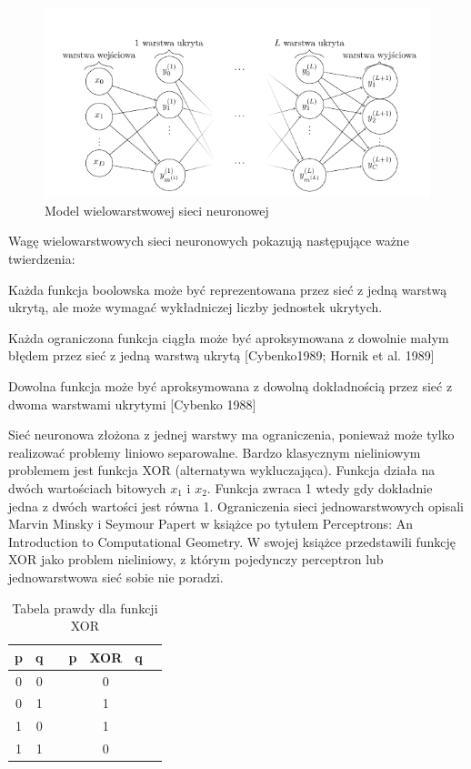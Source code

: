 \begin{figure}[H]
	\centering
	\includegraphics[width=0.7\linewidth]{multi_layer_neural}
	\caption{Model wielowarstwowej sieci neuronowej}
	\label{fig:multilayerneural}
\end{figure}



Wagę wielowarstwowych sieci neuronowych pokazują następujące ważne twierdzenia:

\begin{twierdzenie}
	Każda funkcja boolowska może być reprezentowana przez sieć z jedną warstwą ukrytą, ale może wymagać wykładniczej liczby jednostek ukrytych.
\end{twierdzenie}

\begin{twierdzenie}
	Każda ograniczona funkcja ciągła może być aproksymowana z dowolnie małym błędem przez sieć z jedną warstwą ukrytą [Cybenko1989; Hornik et al. 1989]
\end{twierdzenie}

\begin{twierdzenie}
	Dowolna funkcja może być aproksymowana z dowolną dokładnością przez sieć z dwoma warstwami ukrytymi [Cybenko 1988]
\end{twierdzenie}

Sieć neuronowa złożona z jednej warstwy ma ograniczenia, ponieważ może tylko realizować problemy liniowo separowalne. Bardzo klasycznym nieliniowym problemem jest funkcja XOR (alternatywa wykluczająca). Funkcja działa na dwóch wartościach bitowych $x_{1}$ i $x_{2}$. Funkcja zwraca 1 wtedy gdy dokładnie jedna z dwóch wartości jest równa 1. Ograniczenia sieci jednowarstwowych opisali Marvin Minsky i Seymour Papert w książce po tytułem Perceptrons: An Introduction to Computational Geometry. W swojej książce przedstawili funkcję XOR jako problem nieliniowy, z którym pojedynczy perceptron lub jednowarstwowa sieć sobie nie poradzi. 

 
	\begin{table}[H]
	\centering
	\begin{tabular}{@{ }c@{ }@{ }c | c@{ }@{ }c@{ }@{ }c@{ }@{ }c@{ }@{ }c}
		p & q &  & p & XOR & q & \\
		\hline 
		0 & 0 &  &  &  0& \\
		0 & 1 &  &  &  1 & \\
		1 & 0 &  & &   1& \\
		1 & 1 &  &  & 0& \\
	\end{tabular}
	\caption{Tabela prawdy dla funkcji XOR} \label{tab:sometab}
	\end{table}
 

